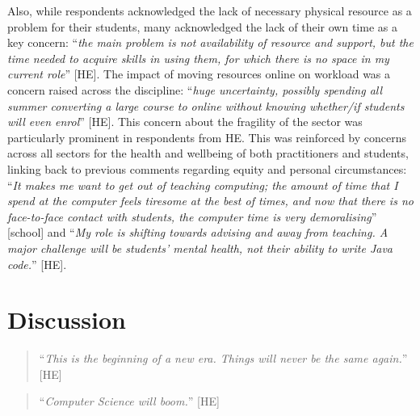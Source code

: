 \documentclass[sigconf]{acmart}
\begin{document}
Also, while respondents acknowledged the lack of necessary physical
resource as a problem for their students, many acknowledged the lack
of their own time as a key concern: ``{\emph{the main problem is not
availability of resource and support, but the time needed to acquire
skills in using them, for which there is no space in my current
role}}'' [HE]. The impact of moving resources online on workload was a
concern raised across the discipline: ``{\emph{huge uncertainty,
possibly spending all summer converting a large course to online
without knowing whether/if students will even enrol}}'' [HE]. This
concern about the fragility of the sector was particularly prominent
in respondents from HE. This was reinforced by concerns across all
sectors for the health and wellbeing of both practitioners and
students, linking back to previous comments regarding equity and
personal circumstances: ``{\emph{It makes me want to get out of
teaching computing; the amount of time that I spend at the computer
feels tiresome at the best of times, and now that there is no
face-to-face contact with students, the computer time is very
demoralising}}'' [school] and ``{\emph{My role is shifting towards
advising and away from teaching. A major challenge will be students'
mental health, not their ability to write Java code.}}'' [HE].

\section{Discussion}\label{discussion}

\begin{quotation}
``{\emph{This is the beginning of a new era. Things will never be the
same again.}}'' [HE]
\end{quotation}

\begin{quotation}
``{\emph{Computer Science will boom.}}'' [HE]
\end{quotation}

\end{document}

